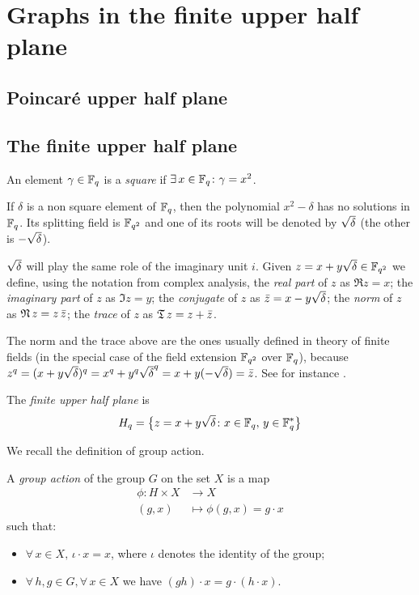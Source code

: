 \section{Graphs in the finite upper half plane}
\subsection{Poincaré upper half plane}
\subsection{The finite upper half plane}
\begin{defn}
	An element $\gamma \in {\mathbb F}_q$ is a {\it square} if $\exists \, x \in {\mathbb F}_q \colon \gamma = x^2$.
\end{defn}
If $\delta$ is a non square element of ${\mathbb F}_q$, then the polynomial $x^2 - \delta$ has no solutions in ${\mathbb F}_q$.
Its splitting field is ${\mathbb F}_{q^2}$ and one of its roots will be denoted by $\sqrt{\delta}$ (the other is $-\sqrt{\delta}$). 

$\sqrt{\delta}$ will play the same role of the imaginary unit $i$. Given $z=x+y\sqrt{\delta} \in {\mathbb F}_{q^2}$ we define,
using the notation from complex analysis, the {\it real part} of $z$ as $\Re z = x$;
the {\it imaginary part} of $z$ as $\Im z = y$;
the {\it conjugate} of $z$ as $\bar{z} = x-y\sqrt{\delta}$; the {\it norm} of $z$ as $\operatorname{\mathfrak{N}} z = z \, \bar{z}$;
the {\it trace} of $z$ as $\operatorname{\mathfrak{T}} z = z+\bar{z}$.
\begin{rem}
The norm and the trace above are the ones usually defined in theory of finite fields (in the special case of the field 
extension ${\mathbb F}_{q^2}$ over ${\mathbb F}_q$), because $z^q= (x+y\sqrt{\delta})^q = x^q+y^q \sqrt{\delta}^q = x+y(-\sqrt{\delta}) =\bar{z}$.
See for instance \cite{lidl1994introduction}.
\end{rem}
\begin{defn}
	The {\it finite upper half plane} is
	\begin{equation}
		H_q = \big\{ z=x+y \sqrt{\delta} \colon x \in {\mathbb F}_q,\, y \in {\mathbb F}_q^* \big\} 
	\end{equation} 
\end{defn}

We recall the definition of group action.
\begin{defn}
  A {\it group action} of the group $G$ on the set $X$ is a map
  \begin{align*}
	\phi \colon H \times X & \longrightarrow X \\ (g,x) &\longmapsto \phi (g,x) = g \cdot x
\end{align*}
such that:
\begin{itemize}
\item $\forall \, x \in X,\, \iota \cdot x = x$, where $\iota$ denotes the identity of the group;
\item $\forall \, h,g \in G, \forall\, x \in X$ we have $(gh)\cdot x=g \cdot (h\cdot x)$.
\end{itemize} 
\end{defn}

